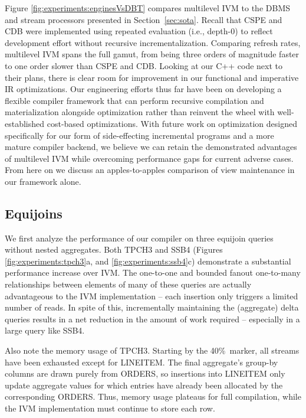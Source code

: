 Figure \ref{fig:experiments:enginesVsDBT} compares multilevel IVM to the DBMS and stream processors presented in Section~\ref{sec:sota}.  Recall that CSPE and CDB were implemented using repeated evaluation (i.e., depth-0) to reflect development effort without recursive incrementalization.  Comparing refresh rates, multilevel IVM spans the full gamut, from being three orders of magnitude faster to one order slower than CSPE and CDB. Looking at our C++ code next to their plans, there is clear room for improvement in our functional and imperative IR optimizations. Our engineering efforts thus far have been on developing a flexible compiler framework that can perform recursive compilation and materialization alongside optimization rather than reinvent the wheel with well-established cost-based optimizations. With future work on optimization designed specifically for our form of side-effecting incremental programs and a more mature compiler backend, we believe we can retain the demonstrated advantages of multilevel IVM while overcoming performance gaps for current adverse cases. From here on we discuss an apples-to-apples comparison of view maintenance in our framework alone.


\subsection{Equijoins}

We first analyze the performance of our compiler on three equijoin queries without nested aggregates.
Both TPCH3 and SSB4 (Figures \ref{fig:experiments:tpch3}a, and \ref{fig:experiments:ssb4}c) demonstrate a substantial performance increase over IVM.  The one-to-one and bounded fanout one-to-many relationships between elements of many of these queries are actually advantageous to the IVM implementation -- each insertion only triggers a limited number of reads.  In spite of this, incrementally maintaining the (aggregate) delta queries results in a net reduction in the amount of work required -- especially in a large query like SSB4.

Also note the memory usage of TPCH3.  Starting by the 40\%\ marker, all streams have been exhausted except for LINEITEM.  The final aggregate's group-by columns are drawn purely from ORDERS, so insertions into LINEITEM only update aggregate values for which entries have already been allocated by the corresponding ORDERS.  Thus, memory usage plateaus for full compilation, while the IVM implementation must continue to store each row.

